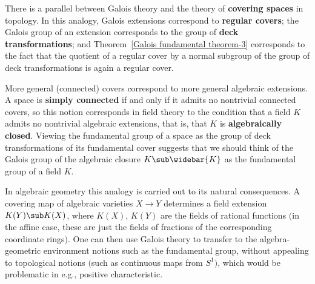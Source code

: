 \begin{remark}
There is a parallel between Galois theory and the theory of \textbf{covering spaces} in topology. In this analogy, Galois extensions correspond to \textbf{regular covers}; the Galois group of an extension corresponds to the group of \textbf{deck transformations}; and Theorem~\ref{Galois fundamental theorem-3} corresponds to the fact that the quotient of a regular cover by a normal subgroup of the group of deck transformations is again a regular cover.\par
More general (connected) covers correspond to more general algebraic extensions. A space is \textbf{simply connected} if and only if it admits no nontrivial connected covers, so this notion corresponds in field theory to the condition that a field $K$ admits no nontrivial algebraic extensions, that is, that $K$ is \textbf{algebraically closed}. Viewing the fundamental group of a space as the group of deck transformations of its fundamental cover suggests that we should think of the Galois group of the algebraic closure $K\sub\widebar{K}$ as the fundamental group of a field $K$.\par
In algebraic geometry this analogy is carried out to its natural consequences. A covering map of algebraic varieties $X\to Y$ determines a field extension $K(Y)\sub K(X)$, where $K(X)$, $K(Y)$ are the fields of rational functions $($in the affine case, these are just the fields of fractions of the corresponding coordinate rings$)$. One can then use Galois theory to transfer to the algebra-geometric environment notions such as the fundamental group, without appealing to topological notions $($such as continuous maps from $S^1$$)$, which would be problematic in 
e.g., positive characteristic.
\end{remark}
